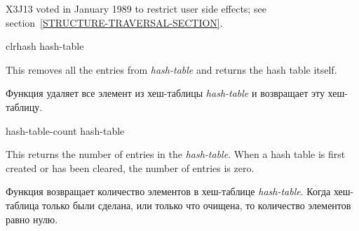 \begin{defun}[Function]
\begin{new}
X3J13 voted in January 1989
to restrict user side effects; see section~\ref{STRUCTURE-TRAVERSAL-SECTION}.
\end{new}
\end{defun}

\begin{defun}[Function]
clrhash hash-table

This removes all the entries from \emph{hash-table}
and returns the hash table itself.

Функция удаляет все элемент из хеш-таблицы \emph{hash-table} и возвращает эту
хеш-таблицу.
\end{defun}

\begin{defun}[Function]
hash-table-count hash-table

This returns the number of entries in the \emph{hash-table}.
When a hash table is first created or has been cleared,
the number of entries is zero.

Функция возвращает количество элементов в хеш-таблице \emph{hash-table}.
Когда хеш-таблица только были сделана, или только что очищена, то количество
элементов равно нулю.
\end{defun}


